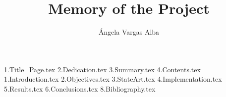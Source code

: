 \documentclass[a4paper, 12pt]{book}
\title{Memory of the Project}
\author{Ángela Vargas Alba}
\begin{document}
\renewcommand{\appendixname}{Apéndice}

{1.Title_Page.tex}
{2.Dedication.tex}
{3.Summary.tex}
{4.Contents.tex}
{1.Introduction.tex}
{2.Objectives.tex}
{3.StateArt.tex}
{4.Implementation.tex}
{5.Results.tex}
{6.Conclusions.tex}
{8.Bibliography.tex}
\end{document}
